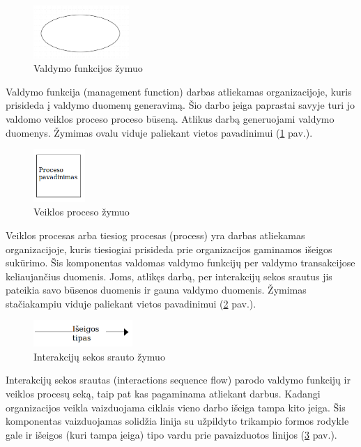 \begin{figure}[H]
	\centering
	\includegraphics[height=2cm]{img/dvcm_components/management_function}
	\caption{Valdymo funkcijos žymuo}
	\label{img:dvcm_components_management_function}
\end{figure}

Valdymo funkcija (management function) darbas atliekamas organizacijoje, kuris prisideda į valdymo duomenų generavimą. Šio darbo įeiga paprastai savyje turi jo valdomo veiklos proceso proceso būseną. Atlikus darbą generuojami valdymo duomenys. Žymimas ovalu viduje paliekant vietos pavadinimui (\ref{img:dvcm_components_management_function} pav.).

\begin{figure}[H]
	\centering
	\includegraphics[height=2cm]{img/dvcm_components/process}
	\caption{Veiklos proceso žymuo}
	\label{img:dvcm_components_process}
\end{figure}

Veiklos procesas arba tiesiog procesas (process) yra darbas atliekamas organizacijoje, kuris tiesiogiai prisideda prie organizacijos gaminamos išeigos
sukūrimo. Šis komponentas valdomas valdymo funkcijų per valdymo transakcijose keliaujančius duomenis. Joms, atlikęs darbą, per interakcijų sekos srautus jis pateikia savo būsenos duomenis ir gauna valdymo duomenis. Žymimas stačiakampiu viduje paliekant vietos pavadinimui (\ref{img:dvcm_components_process} pav.).

\begin{figure}[H]
	\centering
	\includegraphics[height=1cm]{img/dvcm_components/sequence_flow}
	\caption{Interakcijų sekos srauto žymuo}
	\label{img:dvcm_components_sequence_flow}
\end{figure}

Interakcijų sekos srautas (interactions sequence flow) parodo valdymo funkcijų ir veiklos procesų seką, taip pat kas pagaminama atliekant darbus. Kadangi organizacijos veikla vaizduojama ciklais vieno darbo išeiga tampa kito įeiga. Šis komponentas vaizduojamas solidžia linija su užpildyto trikampio formos rodykle
gale ir išeigos (kuri tampa įeiga) tipo vardu prie pavaizduotos linijos (\ref{img:dvcm_components_sequence_flow} pav.).

